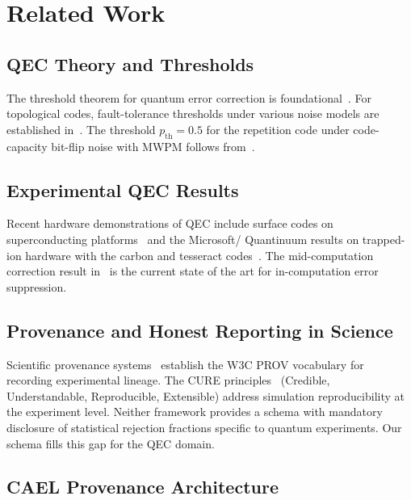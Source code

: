 \documentclass[conference]{IEEEtran}
\newcommand{\pth}{p_{\mathrm{th}}}  %
\begin{document}
\section{Related Work}
\label{sec:related}

\subsection{QEC Theory and Thresholds}

The threshold theorem for quantum error correction is foundational~\cite{aharonov1997fault}.
For topological codes, fault-tolerance thresholds under various noise models
are established in~\cite{fowler2012threshold, dennis2002topological}. The
threshold $\pth = 0.5$ for the repetition code under code-capacity bit-flip
noise with MWPM follows from~\cite{dennis2002topological}.

\subsection{Experimental QEC Results}

Recent hardware demonstrations of QEC include surface codes on
superconducting platforms~\cite{google-qec2023} and the Microsoft/
Quantinuum results on trapped-ion hardware with the carbon and tesseract
codes~\cite{msft-quantinuum-nature2026}. The mid-computation correction
result in~\cite{msft-quantinuum-nature2026} is the current state of the
art for in-computation error suppression.

\subsection{Provenance and Honest Reporting in Science}

Scientific provenance systems~\cite{buneman2001provenance,moreau2013prov}
establish the W3C PROV vocabulary for recording experimental lineage.
The CURE principles~\cite{cure2024} (Credible, Understandable,
Reproducible, Extensible) address simulation reproducibility at the
experiment level. Neither framework provides a schema with mandatory
disclosure of statistical rejection fractions specific to quantum
experiments. Our schema fills this gap for the QEC domain.

\subsection{CAEL Provenance Architecture}
\end{document}

